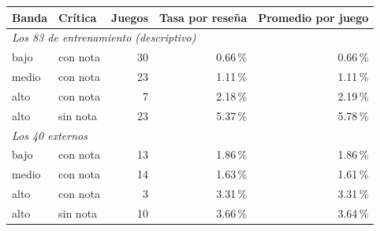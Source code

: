 \begin{tabular}{llrrr}
\toprule
Banda & Crítica & Juegos & Tasa por reseña & Promedio por juego \\
\midrule
\multicolumn{5}{l}{\textit{Los 83 de entrenamiento (descriptivo)}} \\
bajo & con nota & 30 & 0.66\,\% & 0.66\,\% \\
medio & con nota & 23 & 1.11\,\% & 1.11\,\% \\
alto & con nota & 7 & 2.18\,\% & 2.19\,\% \\
alto & sin nota & 23 & 5.37\,\% & 5.78\,\% \\
\midrule
\multicolumn{5}{l}{\textit{Los 40 externos}} \\
bajo & con nota & 13 & 1.86\,\% & 1.86\,\% \\
medio & con nota & 14 & 1.63\,\% & 1.61\,\% \\
alto & con nota & 3 & 3.31\,\% & 3.31\,\% \\
alto & sin nota & 10 & 3.66\,\% & 3.64\,\% \\
\bottomrule
\end{tabular}
